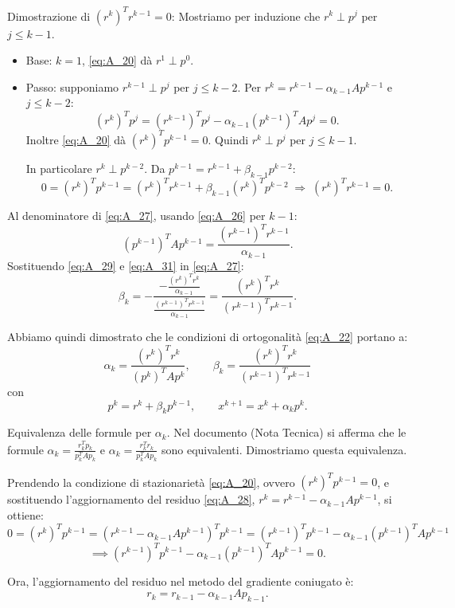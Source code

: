 \documentclass[a4paper,12pt]{article}
\numberwithin{equation}{section}
\numberwithin{figure}{section}
\numberwithin{table}{section}
\begin{document}
Dimostrazione di \((r^k)^T r^{k-1}=0\):  
Mostriamo per induzione che \(r^k\perp p^j\) per \(j\le k-1\).
\begin{itemize}
\item Base: \(k=1\), \eqref{eq:A_20} dà \(r^1\perp p^0\).
\item Passo: supponiamo \(r^{k-1}\perp p^j\) per \(j\le k-2\). Per \(r^k=r^{k-1}-\alpha_{k-1}A p^{k-1}\) e \(j\le k-2\):
\[
(r^k)^T p^j=(r^{k-1})^T p^j-\alpha_{k-1}(p^{k-1})^T A p^j=0.
\]
Inoltre \eqref{eq:A_20} dà \((r^k)^T p^{k-1}=0\). Quindi \(r^k\perp p^j\) per \(j\le k-1\).

In particolare \(r^k\perp p^{k-2}\). Da \(p^{k-1}=r^{k-1}+\beta_{k-1}p^{k-2}\):
\[
0=(r^k)^T p^{k-1}=(r^k)^T r^{k-1}+\beta_{k-1}(r^k)^T p^{k-2}
\;\Longrightarrow\;
(r^k)^T r^{k-1}=0. \tag{A.30}\label{eq:A_30}
\]
\end{itemize}

Al denominatore di \eqref{eq:A_27}, usando \eqref{eq:A_26} per \(k-1\):
\[
(p^{k-1})^T A p^{k-1}=\frac{(r^{k-1})^T r^{k-1}}{\alpha_{k-1}}. \tag{A.31}\label{eq:A_31}
\]
Sostituendo \eqref{eq:A_29} e \eqref{eq:A_31} in \eqref{eq:A_27}:
\[
\beta_k
= -\frac{-\frac{(r^k)^T r^k}{\alpha_{k-1}}}{\frac{(r^{k-1})^T r^{k-1}}{\alpha_{k-1}}}
= \frac{(r^k)^T r^k}{(r^{k-1})^T r^{k-1}}. \tag{A.32}\label{eq:A_32}
\]

Abbiamo quindi dimostrato che le condizioni di ortogonalità \eqref{eq:A_22} portano a:
\[
\alpha_k=\frac{(r^k)^T r^k}{(p^k)^T A p^k},\qquad
\beta_k=\frac{(r^k)^T r^k}{(r^{k-1})^T r^{k-1}}
\tag{A.33}\label{eq:A_33}
\]
con
\[
p^k=r^k+\beta_k p^{k-1},\qquad x^{k+1}=x^k+\alpha_k p^k. \tag{A.34}\label{eq:A_34}
\]

\medskip
\noindent
Equivalenza delle formule per $\alpha_k$.
Nel documento (Nota Tecnica) si afferma che le formule $\alpha_k = \frac{r_k^T p_k}{p_k^T A p_k}$ e $\alpha_k = \frac{r_k^T r_k}{p_k^T A p_k}$ sono equivalenti. Dimostriamo questa equivalenza.

Prendendo la condizione di stazionarietà \eqref{eq:A_20}, ovvero $(r^k)^T p^{k-1} = 0$, e sostituendo l'aggiornamento del residuo \eqref{eq:A_28}, $r^k = r^{k-1} - \alpha_{k-1} A p^{k-1}$, si ottiene:
\[
0 = (r^k)^T p^{k-1} = (r^{k-1} - \alpha_{k-1} A p^{k-1})^T p^{k-1}
= (r^{k-1})^T p^{k-1} - \alpha_{k-1} (p^{k-1})^T A p^{k-1}\]\[\implies
(r^{k-1})^T p^{k-1} - \alpha_{k-1} (p^{k-1})^T A p^{k-1} = 0. \tag{A.35}\label{eq:A_35}
\]

Ora, l'aggiornamento del residuo nel metodo del gradiente coniugato è:
\[
r_k = r_{k-1} - \alpha_{k-1} A p_{k-1}. \tag{A.36}\label{eq:A_36}
\]
\end{document}
